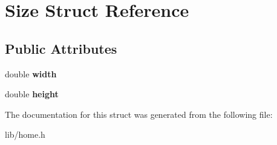 \hypertarget{structSize}{\section{Size Struct Reference}
\label{structSize}
}
\subsection*{Public Attributes}
\begin{DoxyCompactItemize}
\item 
\hypertarget{structSize_a46feb84f0ac34e6b88eab63a0bf6601e}{double {\bfseries width}}\label{structSize_a46feb84f0ac34e6b88eab63a0bf6601e}

\item 
\hypertarget{structSize_a0222024b6e039f76ff8fce795dc0ec6c}{double {\bfseries height}}\label{structSize_a0222024b6e039f76ff8fce795dc0ec6c}

\end{DoxyCompactItemize}


The documentation for this struct was generated from the following file\-:\begin{DoxyCompactItemize}
\item 
lib/home.\-h\end{DoxyCompactItemize}
